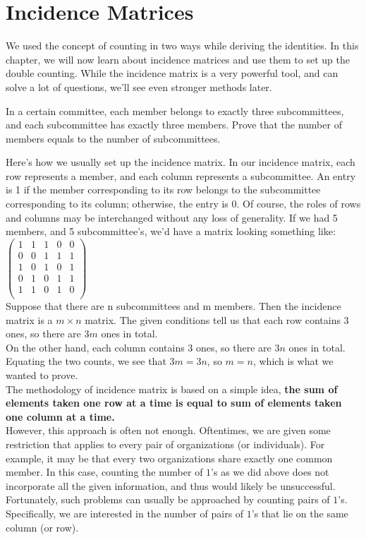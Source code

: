 \section{Incidence Matrices}
We used the concept of counting in two ways while deriving the identities. In this chapter, we will now learn about incidence matrices and use them to set up the double counting. While the incidence matrix is a very powerful tool, and can solve a lot of questions, we'll see even stronger methods later.\\
\begin{example}
In a certain committee, each member belongs to exactly three subcommittees, and each subcommittee has exactly three members. Prove that the number of members equals to the number of subcommittees.
\end{example}
Here’s how we usually set up the incidence matrix. In our incidence matrix, each row represents a member, and each column represents a subcommittee. An entry is 1 if the member corresponding to its row belongs to the subcommittee corresponding to its column; otherwise, the entry is 0. Of course, the roles of rows and columns may be interchanged without any loss of generality. If we had 5 members,  and 5 subcommittee's, we'd have a matrix looking something like:\\
$\begin{pmatrix}
1 & 1 & 1 & 0 & 0 \\
0 & 0 & 1 & 1 & 1 \\
1 & 0 & 1 & 0 & 1 \\
0 & 1 & 0 & 1 & 1 \\
1 & 1 & 0 & 1 & 0 \\
\end{pmatrix}$\\
Suppose that there are n subcommittees and m members. Then the incidence matrix is a $m \times n$ matrix. The given conditions tell us that each row contains 3 ones, so there are $3m$ ones in total.\\
On the other hand, each column contains 3 ones, so there are $3n$ ones in total. Equating the two counts, we see that $3m = 3n$, so $m = n$, which is what we wanted to prove.\\
The methodology of incidence matrix is based on a simple idea, \textbf{the sum of elements taken one row at a time is equal to sum of elements taken one column at a time.}\\
However, this approach is often not enough. Oftentimes, we are given some restriction that applies to every pair of organizations (or individuals). For example, it may be that every two organizations share exactly one common member. In this case, counting the number of $1$’s as we did above does not incorporate all the given information, and thus would likely be unsuccessful. Fortunately, such problems can usually be approached by counting pairs of $1$’s. Specifically, we are interested in the number of pairs of $1$’s that lie on the same column (or row).\\
